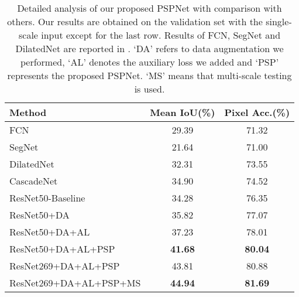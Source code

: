 \documentclass[10pt,twocolumn,letterpaper]{article}
\begin{document}
\begin{table}
\footnotesize
\begin{center}
\begin{tabular}{ l c c}
\hline
Method & Mean IoU(\%) & Pixel Acc.(\%) \\
\hline\hline
FCN \cite{long2015fully} & 29.39 & 71.32 \\
SegNet \cite{badrinarayanan2015segnet} & 21.64 & 71.00 \\
DilatedNet \cite{yu2015multi} & 32.31 & 73.55 \\
CascadeNet \cite{zhou2016semantic} & 34.90 & 74.52 \\
\hline
ResNet50-Baseline & 34.28 & 76.35 \\
ResNet50+DA & 35.82 & 77.07 \\
ResNet50+DA+AL & 37.23 & 78.01 \\
ResNet50+DA+AL+PSP & \textbf{41.68} & \textbf{80.04} \\
\hline
ResNet269+DA+AL+PSP & 43.81 & 80.88 \\
ResNet269+DA+AL+PSP+MS & \textbf{44.94} & \textbf{81.69} \\
\hline
\end{tabular}
\end{center}
\caption{Detailed analysis of our proposed PSPNet with comparison with others. Our
results are obtained on the validation set with the single-scale input except for the
last row. Results of FCN, SegNet and DilatedNet are reported in \cite{zhou2016semantic}.
`DA' refers to data augmentation we performed, `AL' denotes the auxiliary loss we added
and `PSP' represents the proposed PSPNet. `MS' means that multi-scale testing is used.}
\label{tab:baseline}
\end{table}
\end{document}
